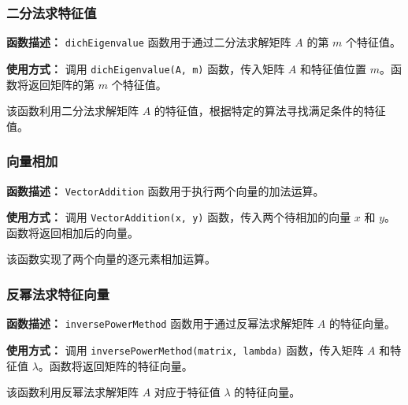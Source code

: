 \documentclass{article}
\begin{document}
\subsubsection*{二分法求特征值}

\textbf{函数描述：} \texttt{dichEigenvalue} 函数用于通过二分法求解矩阵 $A$ 的第 $m$ 个特征值。

\textbf{使用方式：} 调用 \texttt{dichEigenvalue(A, m)} 函数，传入矩阵 $A$ 和特征值位置 $m$。函数将返回矩阵的第 $m$ 个特征值。

该函数利用二分法求解矩阵 $A$ 的特征值，根据特定的算法寻找满足条件的特征值。

\subsubsection*{向量相加}

\textbf{函数描述：} \texttt{VectorAddition} 函数用于执行两个向量的加法运算。

\textbf{使用方式：} 调用 \texttt{VectorAddition(x, y)} 函数，传入两个待相加的向量 $x$ 和 $y$。函数将返回相加后的向量。

该函数实现了两个向量的逐元素相加运算。

\subsubsection*{反幂法求特征向量}

\textbf{函数描述：} \texttt{inversePowerMethod} 函数用于通过反幂法求解矩阵 $A$ 的特征向量。

\textbf{使用方式：} 调用 \texttt{inversePowerMethod(matrix, lambda)} 函数，传入矩阵 $A$ 和特征值 $\lambda$。函数将返回矩阵的特征向量。

该函数利用反幂法求解矩阵 $A$ 对应于特征值 $\lambda$ 的特征向量。
\end{document}
